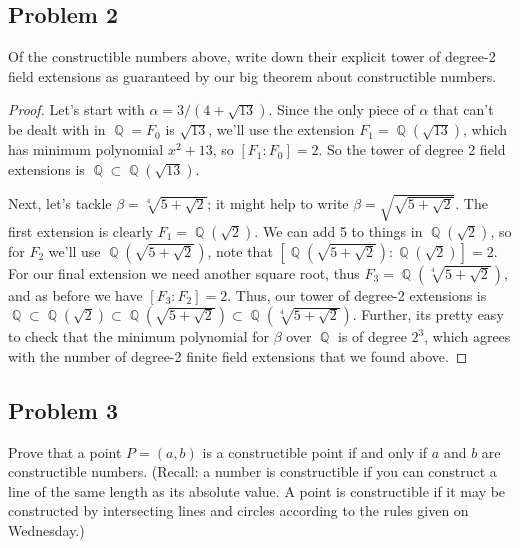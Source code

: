 \documentclass[letterpaper, 12pt]{amsart}
\DeclareMathOperator{\Q}{\mathbb{Q}}
\theoremstyle{definition}  %
\begin{document}
	\subsection*{Problem 2}
	\label{sub:problem_2}
	Of the constructible numbers above, write down their explicit tower of degree-2 field extensions as guaranteed by our big theorem about constructible numbers.

	\begin{proof}
	Let's start with $\alpha = 3/(4 + \sqrt{13})$.
	Since the only piece of $\alpha$ that can't be dealt with in $\Q = F_{0}$ is $\sqrt{13}$, we'll use the extension $F_{1} = \Q(\sqrt{13})$, which has minimum polynomial $x^{2} + 13$, so $[F_{1}:F_{0}] = 2$.
	So the tower of degree 2 field extensions is $\Q \subset \Q(\sqrt{13})$.

	Next, let's tackle $\beta = \sqrt[4]{5 + \sqrt{2}}$; it might help to write $\beta = \sqrt{\sqrt{5 + \sqrt{2}}}$.
	The first extension is clearly $F_{1} = \Q(\sqrt{2})$.
	We can add 5 to things in $\Q(\sqrt{2})$, so for $F_{2}$ we'll use $\Q(\sqrt{5 + \sqrt{2}})$, note that $[\Q(\sqrt{5 + \sqrt{2}}):\Q(\sqrt{2})] = 2$.
	For our final extension we need another square root, thus $F_{3} = \Q(\sqrt[4]{5 + \sqrt{2}})$, and as before we have $[F_{3}:F_{2}] = 2$.
	Thus, our tower of degree-2 extensions is $\Q \subset \Q(\sqrt{2}) \subset \Q(\sqrt{5 + \sqrt{2}}) \subset \Q(\sqrt[4]{5 + \sqrt{2}})$.
	Further, its pretty easy to check that the minimum polynomial for $\beta$ over $\Q$ is of degree $2^{3}$, which agrees with the number of degree-2 finite field extensions that we found above.
	\end{proof}

	\subsection*{Problem 3}
	\label{sub:problem_3}
	Prove that a point $P = (a, b)$ is a constructible point if and only if $a$ and $b$ are constructible numbers. 
	(Recall: a number is constructible if you can construct a line of the same length as its absolute value. 
	A point is constructible if it may be constructed by intersecting lines and circles according to the rules given on Wednesday.)
\end{document}

